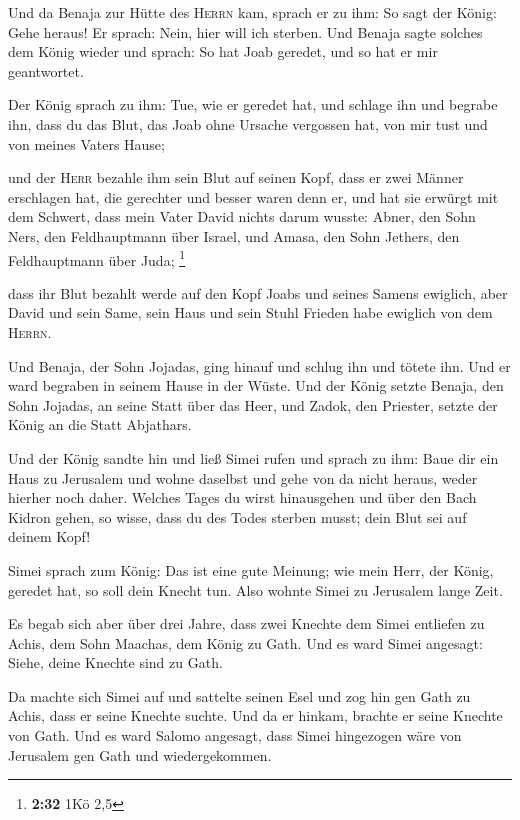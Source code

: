  Und da Benaja zur Hütte des \textsc{Herrn} kam, sprach
er zu ihm: So sagt der König: Gehe heraus! Er sprach: Nein, hier will
ich sterben. Und Benaja sagte solches dem König wieder und sprach: So
hat Joab geredet, und so hat er mir geantwortet.

 Der König sprach zu ihm: Tue, wie er geredet hat, und
schlage ihn und begrabe ihn, dass du das Blut, das Joab ohne Ursache
vergossen hat, von mir tust und von meines Vaters Hause;

 und der \textsc{Herr} bezahle ihm sein Blut auf seinen
Kopf, dass er zwei Männer erschlagen hat, die gerechter und besser waren
denn er, und hat sie erwürgt mit dem Schwert, dass mein Vater David
nichts darum wusste: Abner, den Sohn Ners, den Feldhauptmann über
Israel, und Amasa, den Sohn Jethers, den Feldhauptmann über Juda;
\footnote{\textbf{2:32} 1Kö 2,5}

 dass ihr Blut bezahlt werde auf den Kopf Joabs und
seines Samens ewiglich, aber David und sein Same, sein Haus und sein
Stuhl Frieden habe ewiglich von dem \textsc{Herrn}.

 Und Benaja, der Sohn Jojadas, ging hinauf und schlug ihn
und tötete ihn. Und er ward begraben in seinem Hause in der Wüste.
 Und der König setzte Benaja, den Sohn Jojadas, an seine
Statt über das Heer, und Zadok, den Priester, setzte der König an die
Statt Abjathars.

 Und der König sandte hin und ließ Simei rufen und sprach
zu ihm: Baue dir ein Haus zu Jerusalem und wohne daselbst und gehe von
da nicht heraus, weder hierher noch daher.  Welches Tages
du wirst hinausgehen und über den Bach Kidron gehen, so wisse, dass du
des Todes sterben musst; dein Blut sei auf deinem Kopf!

 Simei sprach zum König: Das ist eine gute Meinung; wie
mein Herr, der König, geredet hat, so soll dein Knecht tun. Also wohnte
Simei zu Jerusalem lange Zeit.

 Es begab sich aber über drei Jahre, dass zwei Knechte
dem Simei entliefen zu Achis, dem Sohn Maachas, dem König zu Gath. Und
es ward Simei angesagt: Siehe, deine Knechte sind zu Gath.

 Da machte sich Simei auf und sattelte seinen Esel und
zog hin gen Gath zu Achis, dass er seine Knechte suchte. Und da er
hinkam, brachte er seine Knechte von Gath.  Und es ward
Salomo angesagt, dass Simei hingezogen wäre von Jerusalem gen Gath und
wiedergekommen.

